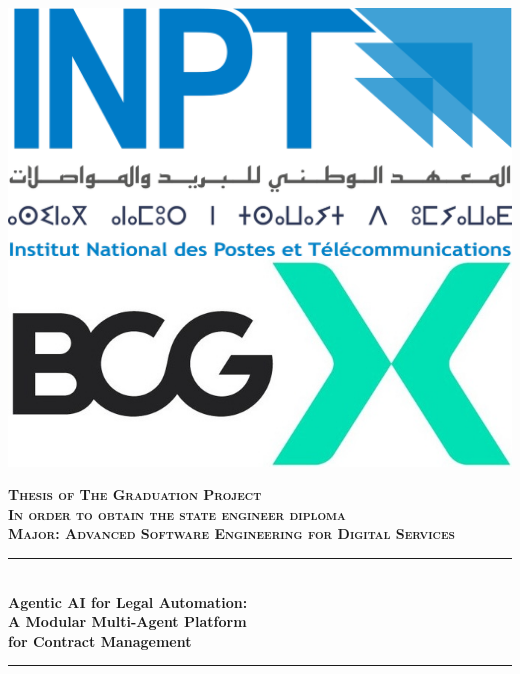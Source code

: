 \begin{titlepage}
  \thispagestyle{empty}
  
  \vspace{0.7cm}

  \includegraphics[scale=0.1]{Images/Logo_inpt.png} 
  \hfill 
  \includegraphics[scale=0.45]{Images/BCG_X.jpg}

  \vspace{0.8cm}
  \begin{center}
  {\large \textsc{\textbf{Thesis of The Graduation Project}}}\\[0.1cm]
  {\large \textsc{\textbf{In order to obtain the state engineer diploma}}}\\[0.1cm]
  {\large \textsc{\textbf{Major: \textbf{Advanced Software Engineering for Digital Services}}}} \\[0.1cm]
  \vspace{1.3cm}

  \rule{\linewidth}{0.3mm} \\[0.6cm]   %
  {\huge \textbf{Agentic AI for Legal Automation:} \\[0.2cm] \vspace{0.1cm} \textbf{A Modular Multi-Agent Platform} \\[0.3cm] \vspace{0.15cm} \textbf{for Contract Management}}\\ [0.6cm]
  \rule{\linewidth}{0.4mm} \\[0.4cm]
  \vspace{1.7cm}


\end{center}
\end{titlepage}
